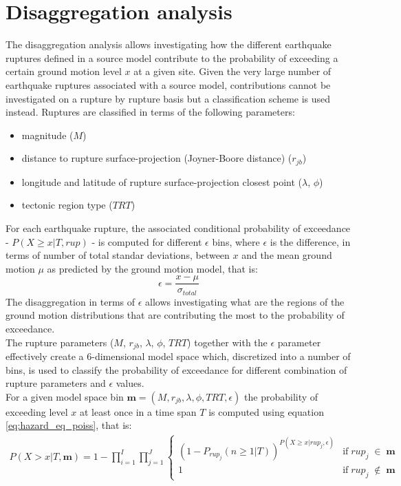 \section{Disaggregation analysis}
The disaggregation analysis allows investigating how the different earthquake ruptures defined in a source model
contribute to the probability of exceeding a certain ground motion level $x$ at a given site. Given the very
large number of earthquake ruptures associated with a source model, contributions cannot be investigated on a rupture by
rupture basis but a classification scheme is used instead. Ruptures are classified in terms of the following parameters:
\begin{itemize}
	\item magnitude ($M$)
	\item distance to rupture surface-projection (Joyner-Boore distance) ($r_{jb}$)
	\item longitude and latitude of rupture surface-projection closest point ($\lambda$, $\phi$)
	\item tectonic region type ($TRT$)
\end{itemize}
For each earthquake rupture, the associated conditional probability of exceedance - $P(X \ge x | T, rup)$ - is computed
for different $\epsilon$ bins, where $\epsilon$ is the difference, in terms of number of total standar deviations,
between $x$ and the mean ground motion $\mu$ as predicted by the ground motion model, that is:
\begin{equation}
\epsilon = \frac{x - \mu}{\sigma_{total}}
\end{equation}
The disaggregation in terms of $\epsilon$ allows investigating what are the regions of the ground motion distributions
that are contributing the most to the probability of exceedance.\\
The rupture parameters ($M$, $r_{jb}$, $\lambda$, $\phi$, $TRT$) together with the $\epsilon$ parameter effectively
create a 6-dimensional model space which, discretized into a number of bins, is used to classify the probability
of exceedance for different combination of rupture parameters and $\epsilon$ values.\\
For a given model space bin $\bm{m} = (M, r_{jb}, \lambda, \phi, TRT, \epsilon)$ the probability of
exceeding level $x$ at least once in a time span $T$ is computed using equation \ref{eq:hazard_eq_poiss}, that is:
\begin{align}
\label{eq:disagg}
P(X > x | T, \bm{m}) =
	1 - \prod_{i=1}^{I}\prod_{j=1}^{J}
	\begin{cases} (1 - P_{rup_{j}}(n \ge 1 | T))^{P(X \ge x | rup_{j}, \epsilon)} & \mbox{if}\;rup_{j}\;\in\;\bm{m}\\
			      1 & \mbox{if}\;rup_{j}\;\notin\;\bm{m}
	\end{cases}
\end{align}

